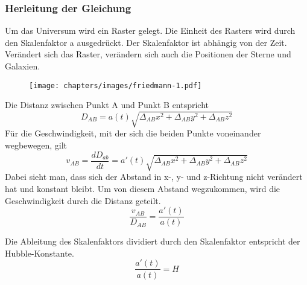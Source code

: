 \begin{refsection}
\subsubsection{Herleitung der Gleichung}
Um das Universum wird ein Raster gelegt. Die Einheit des Rasters wird durch den Skalenfaktor a ausgedr\"{u}ckt. Der Skalenfaktor ist abh\"{a}ngig von der Zeit. Ver\"{a}ndert sich das Raster, ver\"{a}ndern sich auch die Positionen der Sterne und Galaxien.
\begin{figure}
	\texttt{[image: chapters/images/friedmann-1.pdf]}
\end{figure}
Die Distanz zwischen Punkt A und Punkt B entspricht 
\begin{equation}
D_{AB} = a(t) \sqrt{\Delta_{AB}x^2 + \Delta_{AB}y^2 + \Delta_{AB}z^2}
\end{equation}
F\"{u}r die Geschwindigkeit, mit der sich die beiden Punkte voneinander wegbewegen, gilt
\begin{equation}
v_{AB} = \dfrac{dD_{ab}}{dt} 
	   = a'(t) \sqrt{\Delta_{AB}x^2 + \Delta_{AB}y^2 + \Delta_{AB}z^2}
\end{equation}
Dabei sieht man, dass sich der Abstand in x-, y- und z-Richtung nicht ver\"{a}ndert hat und konstant bleibt. Um von diesem Abstand wegzukommen, wird die Geschwindigkeit durch die Distanz geteilt.
\begin{equation}
\frac{v_{AB} }{D_{AB}} = \frac{a'(t)}{a(t)}
\end{equation}
\begin{satz} 
	Die Ableitung des Skalenfaktors dividiert durch den Skalenfaktor entspricht der Hubble-Konstante.
	\begin{equation}
	\frac{a'(t)}{a(t)} = H
	\end{equation}
\end{satz}
\end{refsection}

